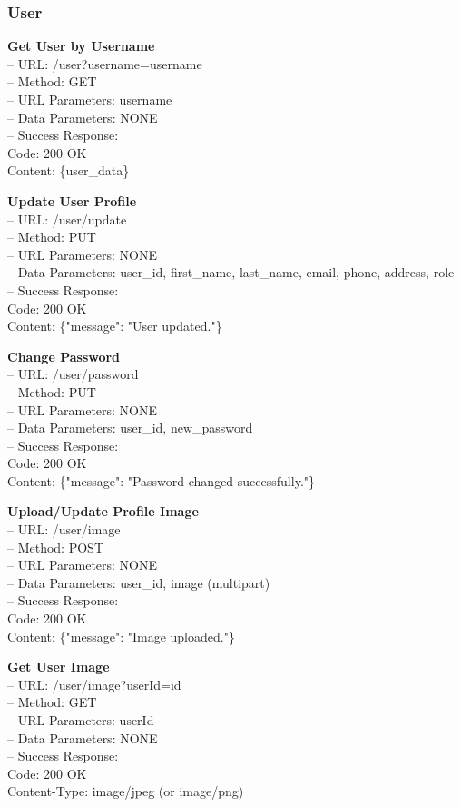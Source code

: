 \subsubsection*{User}
\textbf{Get User by Username} \\
– URL: /user?username={username} \\
– Method: GET \\
– URL Parameters: username \\
– Data Parameters: NONE \\
– Success Response: \\
Code: 200 OK \\
Content: \{user\_data\}

\textbf{Update User Profile} \\
– URL: /user/update \\
– Method: PUT \\
– URL Parameters: NONE \\
– Data Parameters: user_id, first_name, last_name, email, phone, address, role \\
– Success Response: \\
Code: 200 OK \\
Content: \{"message": "User updated."\}

\textbf{Change Password} \\
– URL: /user/password \\
– Method: PUT \\
– URL Parameters: NONE \\
– Data Parameters: user_id, new_password \\
– Success Response: \\
Code: 200 OK \\
Content: \{"message": "Password changed successfully."\}

\textbf{Upload/Update Profile Image} \\
– URL: /user/image \\
– Method: POST \\
– URL Parameters: NONE \\
– Data Parameters: user_id, image (multipart) \\
– Success Response: \\
Code: 200 OK \\
Content: \{"message": "Image uploaded."\}

\textbf{Get User Image} \\
– URL: /user/image?userId={id} \\
– Method: GET \\
– URL Parameters: userId \\
– Data Parameters: NONE \\
– Success Response: \\
Code: 200 OK \\
Content-Type: image/jpeg (or image/png)